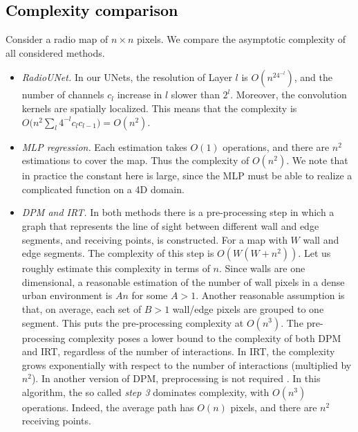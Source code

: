 \documentclass[10pt,a4paper]{article}
\begin{document}
\subsection{\textcolor{black}{Complexity comparison}}
Consider a radio map of $n\times n$ pixels. We compare the asymptotic complexity of all considered methods.
\begin{itemize}
    \item 
    \emph{RadioUNet.}
    In our UNets, the resolution of Layer $l$ is $O(n^24^{-l})$, and the number of channels $c_l$ increase in $l$ slower than $2^l$. Moreover, the convolution kernels are spatially localized. This means that the complexity is $O\big(n^2\sum_l 4^{-l}c_lc_{l-1}\big)=O(n^2)$.
   \item
    \emph{MLP regression.} Each estimation takes $O(1)$ operations, and there are $n^2$ estimations to cover the map. Thus the complexity of $O(n^2)$. We note that in practice the constant here is large, since the MLP must be able to realize a complicated function on a 4D domain.
    \item
    \emph{DPM and IRT.} In both methods there is a pre-processing step in which a graph that represents the line of sight between different wall and edge segments, and receiving points, is constructed. For a map with $W$ wall and edge segments. The complexity of this step is $O(W(W+n^2))$. Let us roughly estimate this complexity in terms of $n$. Since walls are one dimensional, a reasonable estimation of the number of wall pixels in a dense urban environment is $An$ for some $A>1$. Another reasonable assumption is that, on average, each set of $B>1$ wall/edge pixels are grouped to one segment. This puts the pre-processing complexity at $O(n^3)$. The pre-processing complexity poses a lower bound to the complexity of both DPM and IRT, regardless of the number of interactions. In IRT, the complexity grows exponentially with respect to the number of interactions (multiplied by $n^2$). In another version of DPM, preprocessing is not required \cite{Wolfle_fieldstrength}.
    In this algorithm, the so called \emph{step 3} dominates complexity, with $O(n^3)$ operations. Indeed, the average path has $O(n)$ pixels, and there are $n^2$ receiving points.

\end{itemize}
\end{document}
